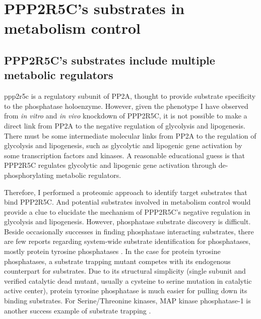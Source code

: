 \section{PPP2R5C's substrates in metabolism control}

\subsection{PPP2R5C's substrates include multiple metabolic regulators}

\gls{ppp2r5c} is a regulatory subunit of \gls{PP2A}, thought to provide substrate specificity to the phosphatase holoenzyme. However, given the phenotype I have observed from \textit{in vitro} and \textit{in vivo} knockdown of PPP2R5C, it is not possible to make a direct link from PP2A to the negative regulation of glycolysis and lipogenesis. There must be some intermediate molecular links from PP2A to the regulation of glycolysis and lipogenesis, such as glycolytic and lipogenic gene activation by some transcription factors and kinases. A reasonable educational guess is that PPP2R5C regulates glycolytic and lipogenic gene activation through de-phosphorylating metabolic regulators. 

Therefore, I performed a proteomic approach to identify target substrates that bind PPP2R5C. And potential substrates involved in metabolism control would provide a clue to elucidate the mechanism of PPP2R5C's negative regulation in glycolysis and lipogenesis. However, phosphatase substrate discovery is difficult. Beside occasionally successes in finding phosphatase interacting substrates, there are few reports regarding system-wide substrate identification for phosphatases, mostly protein tyrosine phosphatases \cite{boubekeur_new_2011,flint_development_1997,wu_identification_2006}. In the  case for protein tyrosine phosphatases, a substrate trapping mutant competes with its endogenous counterpart for substrates. Due to its structural simplicity (single subunit and verified catalytic dead mutant, usually a cysteine to serine mutation in catalytic active center), protein tyrosine phosphatase is much easier for pulling down its binding substrates. For Serine/Threonine kinases, MAP kinase phosphatase-1 is another success example of substrate trapping \cite{kinney_histone_2009}.

